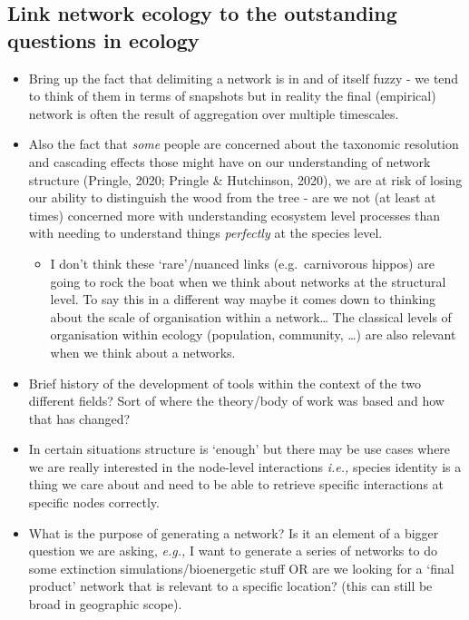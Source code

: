 \documentclass[
]{agujournal2019}
\providecommand{\tightlist}{%
  \setlength{\itemsep}{0pt}\setlength{\parskip}{0pt}}\usepackage{longtable,booktabs,array}
\begin{document}
\subsection{Link network ecology to the outstanding questions in
ecology}\label{link-network-ecology-to-the-outstanding-questions-in-ecology}

\begin{itemize}
\item
  Bring up the fact that delimiting a network is in and of itself fuzzy
  - we tend to think of them in terms of snapshots but in reality the
  final (empirical) network is often the result of aggregation over
  multiple timescales.
\item
  Also the fact that \emph{some} people are concerned about the
  taxonomic resolution and cascading effects those might have on our
  understanding of network structure (Pringle, 2020; Pringle \&
  Hutchinson, 2020), we are at risk of losing our ability to distinguish
  the wood from the tree - are we not (at least at times) concerned more
  with understanding ecosystem level processes than with needing to
  understand things \emph{perfectly} at the species level.

  \begin{itemize}
  \tightlist
  \item
    I don't think these `rare'/nuanced links (e.g.~carnivorous hippos)
    are going to rock the boat when we think about networks at the
    structural level. To say this in a different way maybe it comes down
    to thinking about the scale of organisation within a network\ldots{}
    The classical levels of organisation within ecology (population,
    community, \ldots) are also relevant when we think about a networks.
  \end{itemize}
\item
  Brief history of the development of tools within the context of the
  two different fields? Sort of where the theory/body of work was based
  and how that has changed?
\item
  In certain situations structure is `enough' but there may be use cases
  where we are really interested in the node-level interactions
  \emph{i.e.,} species identity is a thing we care about and need to be
  able to retrieve specific interactions at specific nodes correctly.
\item
  What is the purpose of generating a network? Is it an element of a
  bigger question we are asking, \emph{e.g.,} I want to generate a
  series of networks to do some extinction simulations/bioenergetic
  stuff OR are we looking for a `final product' network that is relevant
  to a specific location? (this can still be broad in geographic scope).
\end{itemize}
\end{document}
